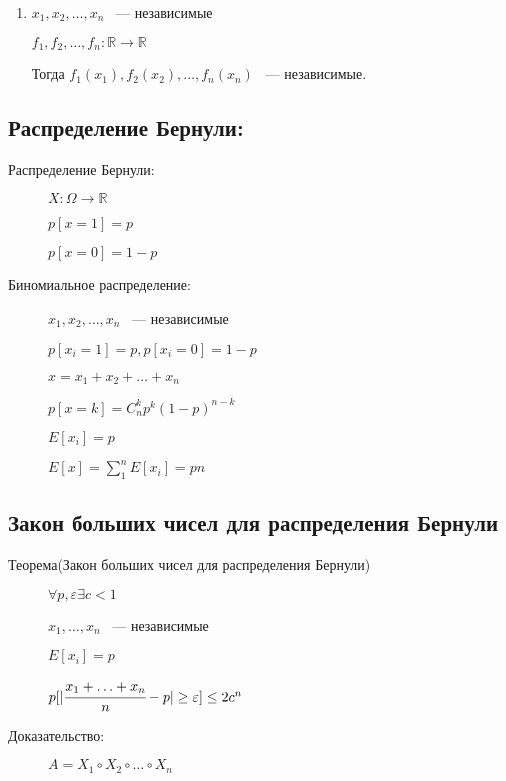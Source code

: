 \documentclass[12pt]{article}
\renewcommand{\epsilon}{\varepsilon}
\begin{document}
\begin{description}
\begin{description}
\begin{enumerate}
\item $x_1, x_2, \ldots, x_n$ ~--- независимые

$f_1, f_2, \ldots, f_n: \mathbb R \to \mathbb R$

Тогда $f_1(x_1), f_2(x_2), \ldots, f_n(x_n)$ ~--- независимые.
\end{enumerate}


\end{description}


\subsection{Распределение Бернули:}

\begin{description}
\item[Распределение Бернули:] 

$X: \Omega \to \mathbb R$

$p[x = 1] = p$


$p[x = 0] = 1 - p$

\item[Биномиальное распределение:]

$x_1, x_2, \ldots, x_n$ ~--- независимые

$p[x_i = 1] = p, p[x_i = 0] = 1 - p$

$x = x_1 + x_2 + \ldots + x_n$

$p[x = k] = C_n^k p^k (1 - p)^{n - k}$

$E[x_i] = p$

$E[x] = \sum_{1}^n E[x_i] = pn$
\end{description}

\subsection{Закон больших чисел для распределения Бернули}

\begin{description}
\item[Теорема(Закон больших чисел для распределения Бернули)]

$\forall p, \epsilon \exists c < 1$

$x_1, \ldots, x_n$ ~--- независимые

$E[x_i] = p$

$p[|\cfrac{x_1 + \ldots + x_n}{n} - p| \ge \epsilon] \le 2c^n$

\item[Доказательство:]

$A = X_1 \circ X_2 \circ \ldots \circ X_n$


\end{description}
\end{description}
\end{document}
